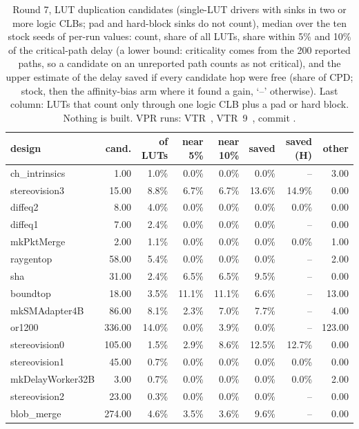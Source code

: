 \begin{table}[t]
\caption{Round 7, LUT duplication candidates (single-LUT drivers with sinks in two or more logic CLBs; pad and hard-block sinks do not count), median over the ten stock seeds of per-run values: count, share of all LUTs, share within 5\% and 10\% of the critical-path delay (a lower bound: criticality comes from the 200 reported paths, so a candidate on an unreported path counts as not critical), and the upper estimate of the delay saved if every candidate hop were free (share of CPD; stock, then the affinity-bias arm where it found a gain, `--' otherwise). Last column: LUTs that count only through one logic CLB plus a pad or hard block. Nothing is built. VPR runs: VTR~\cite{rose2012vtr}, VTR~9~\cite{elgammal2025vtr9}, commit .}
\label{tab:r7dup}
\centering\scriptsize
\begin{tabular}{@{}lrrrrrrr@{}}
\toprule
design & cand. & of LUTs & near 5\% & near 10\% & saved & saved (H) & other \\
\midrule
ch\_intrinsics & 1.00 & 1.0\% & 0.0\% & 0.0\% & 0.0\% & -- & 3.00 \\
stereovision3 & 15.00 & 8.8\% & 6.7\% & 6.7\% & 13.6\% & 14.9\% & 0.00 \\
diffeq2 & 8.00 & 4.0\% & 0.0\% & 0.0\% & 0.0\% & 0.0\% & 0.00 \\
diffeq1 & 7.00 & 2.4\% & 0.0\% & 0.0\% & 0.0\% & -- & 0.00 \\
mkPktMerge & 2.00 & 1.1\% & 0.0\% & 0.0\% & 0.0\% & 0.0\% & 1.00 \\
raygentop & 58.00 & 5.4\% & 0.0\% & 0.0\% & 0.0\% & -- & 2.00 \\
sha & 31.00 & 2.4\% & 6.5\% & 6.5\% & 9.5\% & -- & 0.00 \\
boundtop & 18.00 & 3.5\% & 11.1\% & 11.1\% & 6.6\% & -- & 13.00 \\
mkSMAdapter4B & 86.00 & 8.1\% & 2.3\% & 7.0\% & 7.7\% & -- & 4.00 \\
or1200 & 336.00 & 14.0\% & 0.0\% & 3.9\% & 0.0\% & -- & 123.00 \\
stereovision0 & 105.00 & 1.5\% & 2.9\% & 8.6\% & 12.5\% & 12.7\% & 0.00 \\
stereovision1 & 45.00 & 0.7\% & 0.0\% & 0.0\% & 0.0\% & 0.0\% & 0.00 \\
mkDelayWorker32B & 3.00 & 0.7\% & 0.0\% & 0.0\% & 0.0\% & 0.0\% & 2.00 \\
stereovision2 & 23.00 & 0.3\% & 0.0\% & 0.0\% & 0.0\% & -- & 0.00 \\
blob\_merge & 274.00 & 4.6\% & 3.5\% & 3.6\% & 9.6\% & -- & 0.00 \\
\bottomrule
\end{tabular}
\end{table}

